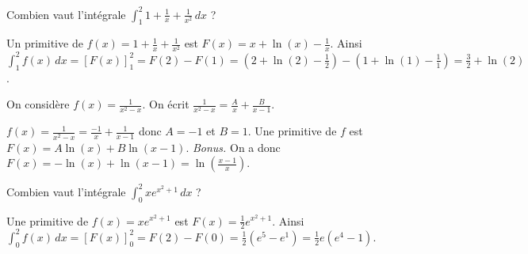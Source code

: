 \documentclass[12pt,a4paper]{article}
\begin{document}
\begin{question}
Combien vaut l'intégrale $\int_1^2 1+\frac1x+\frac1{x^2} \, dx$ ?
\begin{answers}



\end{answers}

\begin{explanations}
Un primitive de $f(x) = 1+\frac1x+\frac1{x^2}$ est $F(x) = x+\ln(x)-\frac1x$.
Ainsi $\int_1^2 f(x) \, dx 
= \left[ F(x) \right]_1^2
= F(2)-F(1) 
= \left( 2+\ln(2)-\frac12 \right) -  \left( 1+\ln(1)-\frac11 \right)
= \frac32+\ln(2)
$.
\end{explanations}

\end{question}


\begin{question}
On considère $f(x) = \frac{1}{x^2-x}$. On écrit
$\frac{1}{x^2-x} = \frac{A}{x} + \frac{B}{x-1}$.
\begin{answers}



\end{answers}

\begin{explanations}
$f(x) = \frac{1}{x^2-x} = \frac{-1}{x} + \frac{1}{x-1}$ donc $A=-1$ et $B=1$.
Une primitive de $f$ est $F(x) = A \ln(x) + B\ln(x-1)$.
\emph{Bonus.} On a donc  $F(x) = - \ln(x) + \ln(x-1) = \ln\left( \frac{x-1}{x} \right)$.
\end{explanations}

\end{question}


\begin{question}
Combien vaut l'intégrale $\int_0^2 xe^{x^2+1} \, dx$ ?
\begin{answers}



\end{answers}

\begin{explanations}
Une primitive de $f(x) = xe^{x^2+1}$ est $F(x) = \frac12e^{x^2+1}$.
Ainsi $\int_0^2 f(x) \, dx 
= \left[ F(x) \right]_0^2
= F(2)-F(0) 
= \frac12\left( e^5-e^1 \right)
= \frac12e\left( e^4-1 \right)
$.
\end{explanations}

\end{question}
\end{document}
